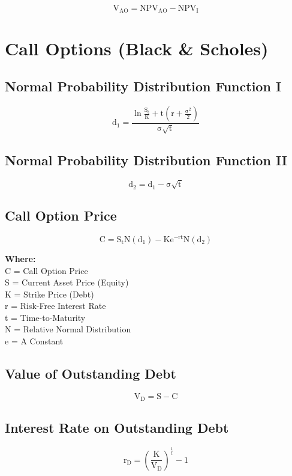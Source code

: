 \documentclass[11pt, english]{article}
\begin{document}
	$$\mathrm{V_{AO}=NPV_{AO}-NPV_I}$$

\newpage

\section{Call Options (Black \& Scholes)}

	\subsection{Normal Probability Distribution Function I}

	$$\mathrm{d_1=\frac{\ln\frac{S_t}{K}+t\left(r+\frac{\sigma^2}{2}\right)}{\sigma\sqrt{t}}}$$

	\subsection{Normal Probability Distribution Function II}

	$$\mathrm{d_2=d_1-\sigma\sqrt{t}}$$

	\subsection{Call Option Price}

	$$\mathrm{C=S_tN(d_1)-Ke^{-rt}N(d_2)}$$

	\textbf{Where:}\\
	C = Call Option Price\\
	S = Current Asset Price (Equity)\\
	K = Strike Price (Debt)\\
	r = Risk-Free Interest Rate\\
	t = Time-to-Maturity\\
	N = Relative Normal Distribution\\
	e = A Constant

	\subsection{Value of Outstanding Debt}

	$$\mathrm{V_D=S-C}$$

	\subsection{Interest Rate on Outstanding Debt}

	$$\mathrm{r_D=\left(\frac{K}{V_D}\right)^{\frac{1}{t}}-1}$$
\end{document}
